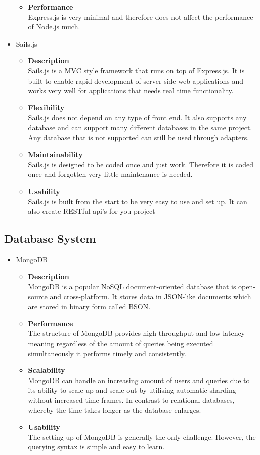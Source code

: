 \documentclass[11pt,fleqn]{book} %
\begin{document}
\begin{itemize}
\begin{itemize}
			\item \textbf{Performance}\\
			Express.js is very minimal and therefore does not affect the performance of Node.js much.
		\end{itemize}
		\item Sails.js
		\begin{itemize}
			\item \textbf{Description}\\
			Sails.js is a MVC style framework that runs on top of Express.js. It is built to enable rapid development of server side web applications and works very well for applications that needs real time functionality.
			\item \textbf{Flexibility}\\
			Sails.js does not depend on any type of front end. It also supports any database and can support many different databases in the same project. Any database that is not supported can still be used through adapters.
			\item \textbf{Maintainability}\\
			Sails.js is designed to be coded once and just work. Therefore it is coded once and forgotten very little maintenance is needed.
			\item \textbf{Usability}\\
			Sails.js is built from the start to be very easy to use and set up. It can also create RESTful api’s for you project
		\end{itemize}
	\end{itemize}
	\subsection{Database System}
	\begin{itemize}
		\item MongoDB
		\begin{itemize}
			\item \textbf{Description}\\
			MongoDB is a popular NoSQL document-oriented database that is open-source and cross-platform. It stores data in JSON-like documents which are stored in binary form called BSON.
			\item \textbf{Performance}\\
			The structure of MongoDB provides high throughput and low latency meaning regardless of the amount of queries being executed simultaneously it performs timely and consistently.
			\item \textbf{Scalability}\\
			MongoDB can handle an increasing amount of users and queries due to its ability to scale up and scale-out by utilising automatic sharding without increased time frames. In contrast to relational databases, whereby the time takes longer as the database enlarges.
			\item \textbf{Usability}\\
			The setting up of MongoDB is generally the only challenge. However, the querying syntax is simple and easy to learn.
		\end{itemize}
	\end{itemize}
\end{document}
